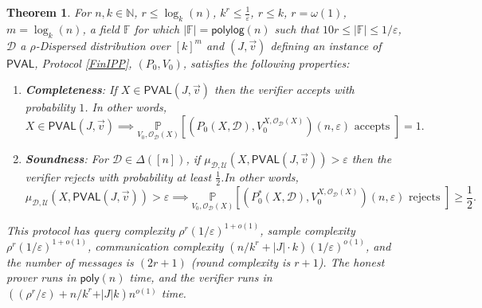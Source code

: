 \documentclass[11pt]{article}
\newtheorem{theorem}{Theorem}[section]
\newcommand{\poly}{\mathsf{poly}}
\newcommand{\polylog}{\mathsf{polylog}}
\newcommand{\PVAL}{\mathsf{PVAL}}
\newcommand{\F}{\mathbb{F}}
\newcommand{\N}{\mathbb{N}}
\newcommand{\sD}{\mathcal{D}}
\begin{document}
\begin{theorem}
\label{ippthm}
For $n,k\in \N$, $ r\leq \log_{k}(n)$, $k^{r}\leq \frac{1}{\varepsilon}$, $r\leq k$, $r=\omega(1)$, $m=\log_{k}(n)$, a field $\F$ for which $\vert \F \vert=\polylog(n)$ such that $10r\leq |\F|\leq 1/\varepsilon$, $\sD$ a $\rho$-Dispersed distribution over $[k]^{m}$ and $(J,\vec{v})$ defining an instance of $\PVAL$, Protocol \ref{FinIPP}, $(P_0, V_0)$, satisfies the following properties:

\begin{enumerate}
    \item \textbf{Completeness}: If $X\in \PVAL(J,\Vec{v})$ then the verifier accepts with probability $1$. In other words,
    \begin{equation*}
        X\in \PVAL(J,\Vec{v})\implies \underset{V_{0},\mathcal{O}_{\mathcal{D}}(X)}{\mathbb{P}}\left[(P_{0}(X,\sD),V_{0}^{X,\mathcal{O}_{\sD}(X)})(n,\varepsilon) \text{ accepts }\right]=1.
    \end{equation*}
    \item \textbf{Soundness}: For $\sD\in \Delta([n])$, if $\mu_{\sD,\mathcal{U}}(X,\PVAL(J,\vec{v}))>\varepsilon$ then the verifier rejects with probability at least $\frac{1}{2}$.In other words,
    \begin{equation*}
        \mu_{\sD,\mathcal{U}}(X,\PVAL(J,\vec{v}))>\varepsilon\implies \underset{V_{0},\mathcal{O}_{\mathcal{D}}(X)}{\mathbb{P}}\left[(P^{\ast}_{0}(X,\sD),V_{0}^{X,\mathcal{O}_{\sD}(X)})(n,\varepsilon) \text{ rejects } \right]\geq \frac{1}{2}.
    \end{equation*}
\end{enumerate}

This protocol has query complexity $\rho^{r}(1/\varepsilon)^{1+o(1)}$, sample complexity $\rho^{r}(1/\varepsilon)^{1+o(1)}$, communication complexity $(n/k^{r}+|J|\cdot k)(1/\varepsilon)^{o(1)}$, and the number of messages is $(2r + 1)$ (round complexity is $r+1$). The honest prover runs in $\poly(n)$ time, and the verifier runs in $((\rho^{r}/\varepsilon) + n/k^{r} + \vert J\vert k)n^{o(1)}$ time.
\end{theorem}
\end{document}
